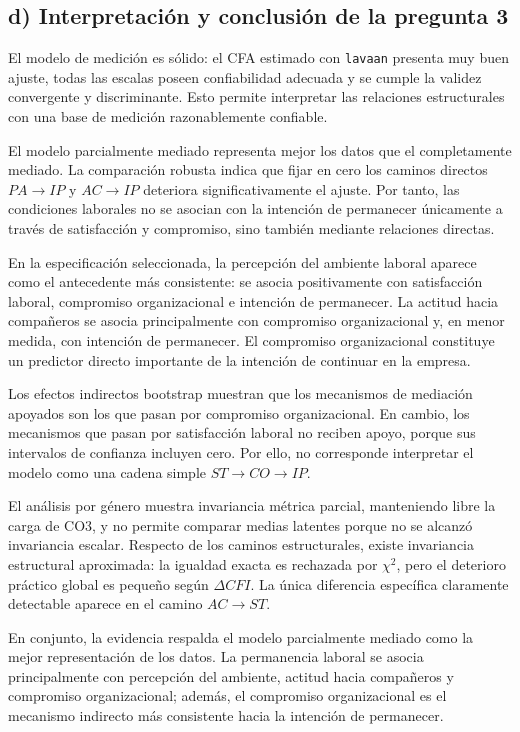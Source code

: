 \documentclass[12pt,letterpaper]{article}
\begin{document}
\subsection{d) Interpretación y conclusión de la pregunta 3}

El modelo de medición es sólido: el CFA estimado con \texttt{lavaan} presenta muy buen ajuste, todas las escalas poseen confiabilidad adecuada y se cumple la validez convergente y discriminante. Esto permite interpretar las relaciones estructurales con una base de medición razonablemente confiable.

El modelo parcialmente mediado representa mejor los datos que el completamente mediado. La comparación robusta indica que fijar en cero los caminos directos $PA\rightarrow IP$ y $AC\rightarrow IP$ deteriora significativamente el ajuste. Por tanto, las condiciones laborales no se asocian con la intención de permanecer únicamente a través de satisfacción y compromiso, sino también mediante relaciones directas.

En la especificación seleccionada, la percepción del ambiente laboral aparece como el antecedente más consistente: se asocia positivamente con satisfacción laboral, compromiso organizacional e intención de permanecer. La actitud hacia compañeros se asocia principalmente con compromiso organizacional y, en menor medida, con intención de permanecer. El compromiso organizacional constituye un predictor directo importante de la intención de continuar en la empresa.

Los efectos indirectos bootstrap muestran que los mecanismos de mediación apoyados son los que pasan por compromiso organizacional. En cambio, los mecanismos que pasan por satisfacción laboral no reciben apoyo, porque sus intervalos de confianza incluyen cero. Por ello, no corresponde interpretar el modelo como una cadena simple $ST\rightarrow CO\rightarrow IP$.

El análisis por género muestra invariancia métrica parcial, manteniendo libre la carga de CO3, y no permite comparar medias latentes porque no se alcanzó invariancia escalar. Respecto de los caminos estructurales, existe invariancia estructural aproximada: la igualdad exacta es rechazada por $\chi^2$, pero el deterioro práctico global es pequeño según $\Delta CFI$. La única diferencia específica claramente detectable aparece en el camino $AC\rightarrow ST$.

En conjunto, la evidencia respalda el modelo parcialmente mediado como la mejor representación de los datos. La permanencia laboral se asocia principalmente con percepción del ambiente, actitud hacia compañeros y compromiso organizacional; además, el compromiso organizacional es el mecanismo indirecto más consistente hacia la intención de permanecer.
\end{document}
